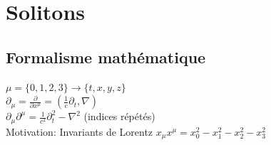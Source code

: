 \documentclass[handout]{beamer}
\begin{document}
\section{Solitons}

%
%      

\subsection{Formalisme mathématique}
\begin{frame}
\begin{exampleblock}{}
 $\mu = \{0,1,2,3\} \rightarrow \{t,x,y,z\}$\\[0.25 cm]
 $\partial_\mu = \frac{\partial}{\partial x^\mu}=(\frac{1}{c} \partial_t, \nabla) $\\[0.25 cm]
 $\partial_\mu \partial^\mu = \frac{1}{c^2} \partial_t^2- \nabla^2 $ (indices répétés)\\[0.25 cm]
 Motivation: Invariants de Lorentz $x_\mu x^\mu = x_0^2 -x_1^2 -x_2^2 -x_3^2$ \\
\end{exampleblock}
\end{frame}
\end{document}
